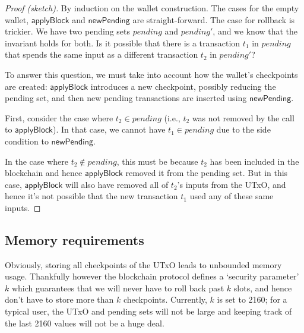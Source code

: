 \documentclass{article}
\numberwithin{equation}{lemma}
\begin{document}
\begin{proof}[Proof (sketch)]
By induction on the wallet construction. The cases for the empty wallet,
$\mathsf{applyBlock}$ and $\mathsf{newPending}$ are straight-forward.
The case for rollback is trickier. We have two pending sets
$\mathit{pending}$ and $\mathit{pending'}$, and we know that the invariant
holds for both. Is it possible that there is a transaction $t_1$ in $\mathit{pending}$
that spends the same input as a different transaction $t_2$ in $\mathit{pending}'$?

To answer this question, we must take into account how the wallet's checkpoints
are created: $\mathsf{applyBlock}$ introduces a new checkpoint, possibly
reducing the pending set, and then new pending transactions are inserted using
$\mathsf{newPending}$.

First, consider the case where $t_2 \in \mathit{pending}$ (i.e., $t_2$ was not
removed by the call to $\mathsf{applyBlock}$). In that case, we cannot have $t_1
\in \mathit{pending}$ due to the side condition to $\mathsf{newPending}$.

In the case where $t_2 \notin \mathit{pending}$, this must be because $t_2$
has been included in the blockchain and hence $\mathsf{applyBlock}$ removed
it from the pending set. But in this case, $\mathsf{applyBlock}$ will also
have removed all of $t_2$'s inputs from the UTxO, and hence it's not possible
that the new transaction $t_1$ used any of these same inputs.
\end{proof}


\subsection{Memory requirements}

Obviously, storing all checkpoints of the UTxO leads to unbounded memory usage.
Thankfully however the blockchain protocol defines a `security parameter' $k$
which guarantees that we will never have to roll back past $k$ slots, and hence
don't have to store more than $k$ checkpoints. Currently, $k$ is set to 2160;
for a typical user, the UTxO and pending sets will not be large and keeping
track of the last 2160 values will not be a huge deal.

\end{document}
